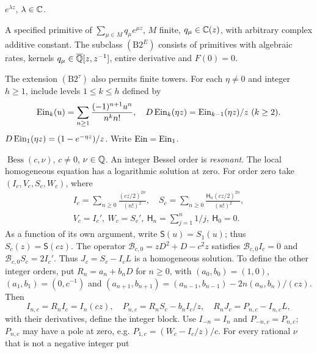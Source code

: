 \begin{description}\setlength{\itemsep}{0pt}\setlength{\parsep}{0pt}
\item[(B1)] $e^{\lambda z}$, $\lambda\in\mathbb{C}$.
\item[(B2)] A specified primitive of $\sum_{\mu\in M}q_\mu e^{\mu z}$,
$M$ finite, $q_\mu\in\mathbb{C}(z)$, with arbitrary complex additive constant.
The subclass $(\mathrm{B2}^E)$ consists of primitives with algebraic
rates, kernels $q_\mu\in{\overline{\mathbb{Q}}}[z,z^{-1}]$, entire derivative and $F(0)=0$.
\par\noindent
The extension $(\mathrm{B2}^\tau)$ also permits finite towers. For each
$\eta\ne0$ and integer $h\ge1$, include levels $1\le k\le h$ defined by
\begin{equation}\label{eq:ein-tower}
\operatorname{Ein}_k(u)=\sum_{n\ge1}\frac{(-1)^{n+1}u^n}{n^kn!},\quad
D\operatorname{Ein}_k(\eta z)=\operatorname{Ein}_{k-1}(\eta z)/z\ (k\ge2).
\end{equation}
$D\operatorname{Ein}_1(\eta z)=(1-e^{-\eta z})/z$. Write $\operatorname{Ein}=\operatorname{Ein}_1$.
\item[(B3)] $\operatorname{Bess}(c,\nu)$, $c\ne0$, $\nu\in\mathbb{Q}$.
An integer Bessel order is \emph{resonant}. The local homogeneous equation has a logarithmic solution at zero. For order zero take $(I_c,V_c,S_c,W_c)$, where
\begin{equation}\label{eq:bessel-zero}
\begin{gathered}
I_c=\sum_{n\ge0}\frac{(cz/2)^{2n}}{(n!)^2},\quad
S_c=\sum_{n\ge0}\frac{\mathsf H_n(cz/2)^{2n}}{(n!)^2},\\
V_c=I_c',\ W_c=S_c',\ \mathsf H_n=\sum_{j=1}^n1/j,\ \mathsf H_0=0.
\end{gathered}
\end{equation}
As a function of its own argument, write $\mathsf S(u)=S_1(u)$; thus
$S_c(z)=\mathsf S(cz)$.
The operator $\mathscr B_{c,0}=zD^2+D-c^2z$ satisfies
$\mathscr B_{c,0}I_c=0$ and $\mathscr B_{c,0}S_c=2I_c'$. Thus $J_c=S_c-I_cL$
is a homogeneous solution. To define the other integer orders, put $R_n=a_n+b_nD$ for $n\ge0$, with
$(a_0,b_0)=(1,0)$, $(a_1,b_1)=(0,c^{-1})$ and
$(a_{n+1},b_{n+1})=(a_{n-1},b_{n-1})-2n(a_n,b_n)/(cz)$. Then
\begin{equation}\label{eq:bessel-integer}
I_{n,c}=R_nI_c=I_n(cz),\quad P_{n,c}=R_nS_c-b_nI_c/z,\quad
R_nJ_c=P_{n,c}-I_{n,c}L,
\end{equation}
with their derivatives, define the integer block. Use $I_{-n}=I_n$ and $P_{-n,c}=P_{n,c}$;
$P_{n,c}$ may have a pole at zero, e.g. $P_{1,c}=(W_c-I_c/z)/c$.
For every rational $\nu$ that is not a negative integer put
\begin{equation}\label{eq:bessel-nonresonant}

\end{equation}
\end{description}

